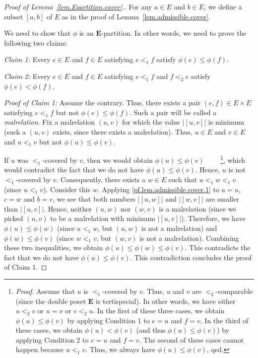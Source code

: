 \documentclass[12pt]{article}
\theoremstyle{plain}
\theoremstyle{definition}
\theoremstyle{remark}
\newcommand{\EE}{{\mathbf{E}}}
\begin{document}
\begin{proof}[Proof of Lemma~\ref{lem.Epartition.cover}.]
For any $a \in E$ and $b \in E$, we define a subset
$\left[a, b\right]$ of $E$ as in the proof of
Lemma~\ref{lem.admissible.cover}.

We need to show that $\phi$ is an $\EE$-partition. In other words,
we need to prove the following two claims:

\textit{Claim 1:} Every $e \in E$ and $f \in E$ satisfying
$e <_1 f$ satisfy $\phi\left(e\right) \leq \phi\left(f\right)$.

\textit{Claim 2:} Every $e \in E$ and $f \in E$ satisfying
$e <_1 f$ and $f <_2 e$ satisfy
$\phi\left(e\right) < \phi\left(f\right)$.

\textit{Proof of Claim 1:} Assume the contrary. Thus, there
exists a pair $\left(e, f\right) \in E \times E$ satisfying
$e <_1 f$ but not $\phi\left(e\right) \leq \phi\left(f\right)$.
Such a pair will be called a \textit{malrelation}. Fix a
malrelation $\left(u, v\right)$ for which the value
$\left|\left[u, v\right]\right|$ is minimum (such a
$\left(u, v\right)$ exists, since there exists a malrelation).
Thus, $u \in E$ and $v \in E$ and $u <_1 v$ but not
$\phi\left(u\right) \leq \phi\left(v\right)$.

If $u$ was $<_1$-covered by $v$, then we would obtain
$\phi\left(u\right) \leq \phi\left(v\right)$
\ \ \ \ \footnote{\textit{Proof.} Assume that $u$ is
$<_1$-covered by $v$. Thus, $u$ and $v$ are $<_2$-comparable
(since the double poset $\EE$ is tertispecial). In other words,
we have either $u <_2 v$ or $u = v$ or $v <_2 u$. In the
first of these three cases, we obtain
$\phi\left(u\right) \leq \phi\left(v\right)$ by applying
Condition 1 to $e = u$ and $f = v$. In the third of these
cases, we obtain
$\phi\left(u\right) < \phi\left(v\right)$ (and thus
$\phi\left(u\right) \leq \phi\left(v\right)$) 
by applying Condition 2 to $e = u$ and $f = v$. The second
of these cases cannot happen because $u <_1 v$. Thus, we
always have $\phi\left(u\right) \leq \phi\left(v\right)$,
qed.}, which would
contradict the fact that we do not have
$\phi\left(u\right) \leq \phi\left(v\right)$. Hence, $u$ is not
$<_1$-covered by $v$. Consequently, there exists a $w \in E$
such that $u <_1 w <_1 v$ (since $u <_1 v$). Consider this
$w$. Applying \eqref{pf.lem.admissible.cover.1} to $a = u$,
$c = w$ and $b = v$, we see that both numbers
$\left|\left[u, w\right]\right|$ and
$\left|\left[w, v\right]\right|$ are smaller than
$\left|\left[u, v\right]\right|$. Hence, neither
$\left(u, w\right)$ nor $\left(w, v\right)$ is a malrelation
(since we picked $\left(u, v\right)$ to be a malrelation with
minimum $\left|\left[u, v\right]\right|$). Therefore, we have
$\phi\left(u\right) \leq \phi\left(w\right)$ (since $u <_1 w$,
but $\left(u, w\right)$ is not a malrelation) and
$\phi\left(w\right) \leq \phi\left(v\right)$ (since $w <_1 v$,
but $\left(w, v\right)$ is not a malrelation).
Combining these two inequalities, we obtain
$\phi\left(u\right) \leq \phi\left(w\right)
\leq \phi\left(v\right)$. This contradicts
the fact that we do not have
$\phi\left(u\right) \leq \phi\left(v\right)$. This contradiction
concludes the proof of Claim 1.


\end{proof}
\end{document}
